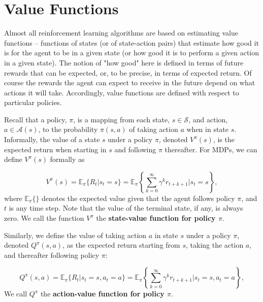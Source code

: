 \section{Value Functions}

Almost all reinforcement learning algorithms are based on estimating value functions 
-- functions of states (or of state-action pairs) that estimate how good it is for 
the agent to be in a given state (or how good it is to perform a given action in a 
given state). The notion of "how good" here is defined in terms of future rewards 
that can be expected, or, to be precise, in terms of expected return. Of course the 
rewards the agent can expect to receive in the future depend on what actions it will 
take. Accordingly, value functions are defined with respect to particular policies.

Recall that a policy, $\pi$, is a mapping from each state, $s\in\mathcal{S}$, and 
action, $a\in\mathcal{A}(s)$, to the probability $\pi(s,a)$ of taking action $a$ 
when in state $s$. Informally, the value of a state $s$ under a policy $\pi$, denoted 
$V^\pi(s)$, is the expected return when starting in $s$ and following $\pi$ thereafter. 
For MDPs, we can define $V^\pi(s)$ formally as

\begin{equation}\label{rl-policy-state-value}
V^\pi(s) = \mathbb{E}_\pi\{R_t|s_t = s\} = 
\mathbb{E}_\pi\left\{ \sum_{k=0}^\infty\gamma^k r_{t+k+1} | s_t = s \right\},
\end{equation}
where $\mathbb{E}_\pi\{ \}$ denotes the expected value given that the agent follows 
policy $\pi$, and $t$ is any time step. Note that the value of the terminal state, if 
any, is always zero. We call the function $V^\pi$ the {\bf state-value function for 
policy $\pi$}.

Similarly, we define the value of taking action $a$ in state $s$ under a policy $\pi$, 
denoted $Q^\pi(s,a)$, as the expected return starting from $s$, taking the action $a$, 
and thereafter following policy $\pi$:

\begin{equation}\label{rl-policy-action-value}
Q^\pi(s, a) = \mathbb{E}_\pi\{R_t|s_t = s, a_t = a\} = 
\mathbb{E}_\pi\left\{ \sum_{k=0}^\infty\gamma^k r_{t+k+1} | s_t = s, a_t = a \right\},
\end{equation}
We call $Q^\pi$ the {\bf action-value function for policy $\pi$}.

